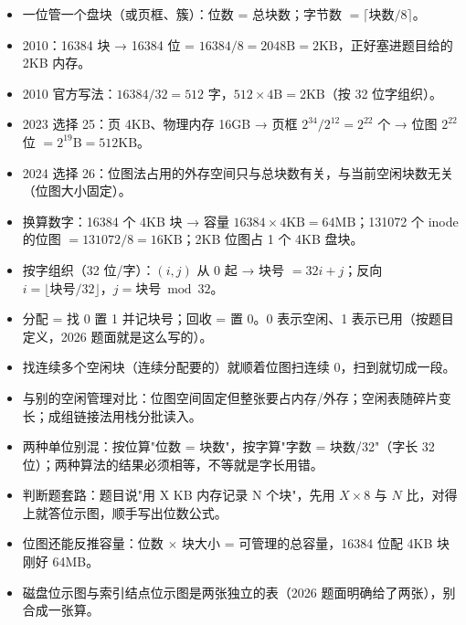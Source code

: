 \documentclass[10pt,a4paper]{ctexart}
\begin{document}
\begin{itemize}

\item 一位管一个盘块（或页框、簇）：位数 = 总块数；字节数 $=\lceil 块数/8\rceil$。

\item 2010：16384 块 → 16384 位 = $16384/8=2048\text{B}=2\text{KB}$，正好塞进题目给的 2KB 内存。

\item 2010 官方写法：$16384/32=512$ 字，$512\times4\text{B}=2\text{KB}$（按 32 位字组织）。

\item 2023 选择 25：页 4KB、物理内存 16GB → 页框 $2^{34}/2^{12}=2^{22}$ 个 → 位图 $2^{22}$ 位 $=2^{19}\text{B}=512\text{KB}$。

\item 2024 选择 26：位图法占用的外存空间只与总块数有关，与当前空闲块数无关（位图大小固定）。

\item 换算数字：16384 个 4KB 块 → 容量 $16384\times4\text{KB}=64\text{MB}$；131072 个 inode 的位图 $=131072/8=16\text{KB}$；2KB 位图占 1 个 4KB 盘块。

\item 按字组织（32 位/字）：$(i,j)$ 从 0 起 → 块号 $=32i+j$；反向 $i=\lfloor 块号/32\rfloor$，$j=块号 \bmod 32$。

\item 分配 = 找 0 置 1 并记块号；回收 = 置 0。0 表示空闲、1 表示已用（按题目定义，2026 题面就是这么写的）。

\item 找连续多个空闲块（连续分配要的）就顺着位图扫连续 0，扫到就切成一段。

\item 与别的空闲管理对比：位图空间固定但整张要占内存/外存；空闲表随碎片变长；成组链接法用栈分批读入。

\item 两种单位别混：按位算"位数 = 块数"，按字算"字数 = 块数/32"（字长 32 位）；两种算法的结果必须相等，不等就是字长用错。

\item 判断题套路：题目说"用 X KB 内存记录 N 个块"，先用 $X\times8$ 与 $N$ 比，对得上就答位示图，顺手写出位数公式。

\item 位图还能反推容量：位数 $\times$ 块大小 = 可管理的总容量，16384 位配 4KB 块刚好 64MB。

\item 磁盘位示图与索引结点位示图是两张独立的表（2026 题面明确给了两张），别合成一张算。

\end{itemize}
\end{document}

